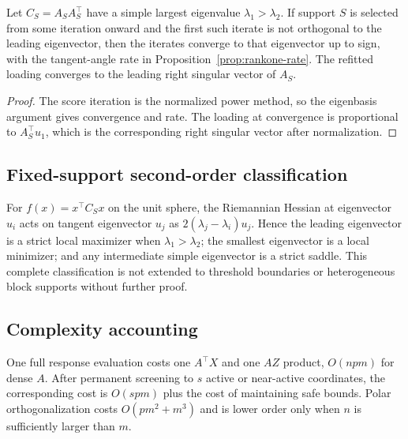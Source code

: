 \begin{theorem}
\label{thm:a-rankone-complete}
Let $C_S=A_SA_S^\top$ have a simple largest eigenvalue $\lambda_1>\lambda_2$. If support $S$ is selected from some iteration onward and the first such iterate is not orthogonal to the leading eigenvector, then the iterates converge to that eigenvector up to sign, with the tangent-angle rate in Proposition~\ref{prop:rankone-rate}. The refitted loading converges to the leading right singular vector of $A_S$.
\end{theorem}
\begin{proof}
The score iteration is the normalized power method, so the eigenbasis argument gives convergence and rate. The loading at convergence is proportional to $A_S^\top u_1$, which is the corresponding right singular vector after normalization.
\end{proof}

\subsection{Fixed-support second-order classification}
For $f(x)=x^\top C_Sx$ on the unit sphere, the Riemannian Hessian at eigenvector $u_i$ acts on tangent eigenvector $u_j$ as $2(\lambda_j-\lambda_i)u_j$. Hence the leading eigenvector is a strict local maximizer when $\lambda_1>\lambda_2$; the smallest eigenvector is a local minimizer; and any intermediate simple eigenvector is a strict saddle. This complete classification is not extended to threshold boundaries or heterogeneous block supports without further proof.

\subsection{Complexity accounting}
One full response evaluation costs one $A^\top X$ and one $AZ$ product, $O(npm)$ for dense $A$. After permanent screening to $s$ active or near-active coordinates, the corresponding cost is $O(spm)$ plus the cost of maintaining safe bounds. Polar orthogonalization costs $O(pm^2+m^3)$ and is lower order only when $n$ is sufficiently larger than $m$.
